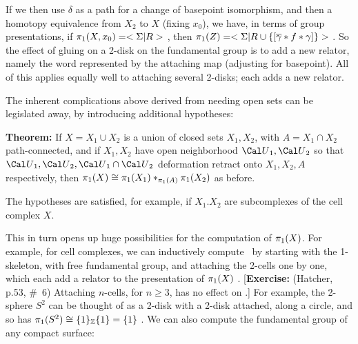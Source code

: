 
If we then use $\delta$ as a path for a change of 
basepoint isomorphism, and then a homotopy
equivalence from $X_2$ to $X$ (fixing $x_0$), we 
have, in terms of group presentations, 
if $\pi_1(X,x_0)=<\Sigma | R>$ , then $\pi_1(Z) = 
<\Sigma | R\cup\{[\overline{\gamma}*f*\gamma]\}>$ . 
So the effect of gluing on a 2-disk on the fundamental 
group is to add a new relator, 
namely the word represented by the attaching map 
(adjusting for basepoint). 
All of this applies equally well to attaching several 
2-disks; each adds a new relator. 

\msk


\leavevmode

\epsfxsize=5.4in



\bsk

The inherent complications above derived from needing open
sets can be legislated away, by introducing additional
hypotheses:

\msk

{\bf Theorem:} If $X=X_1\cup X_2$ is a union of closed
sets $X_1,X_2$, with $A=X_1\cap X_2$ path-connected, 
and if $X_1,X_2$ have open neighborhood ${\Cal U}_1,{\Cal U}_2$
so that ${\Cal U}_1,{\Cal U}_2,{\Cal U}_1\cap{\Cal U}_2$
deformation retract onto $X_1,X_2,A$ respectively, then 
$\pi_1(X)\cong \pi_1(X_1)*_{\pi_1(A)}\pi_1(X_2)$ as before.

\msk

The hypotheses are satisfied, for example, if $X_1.X_2$ are subcomplexes of the
cell complex $X$.

\msk


This in turn opens up huge possibilities for the 
computation of $\pi_1(X)$. For example, for cell complexes,
we can inductively compute \mpu\ by starting with 
the 1-skeleton, with free fundamental group, and 
attaching the 2-cells one by one, which each add 
a relator to the presentation of $\pi_1(X)$ . 
[{\bf Exercise:}
(Hatcher, p.53, \#\ 6) Attaching $n$-cells, for 
$n\geq 3$, has no effect on \mpu .] 
For example, the 2-sphere $S^2$ can be thought of as a
2-disk with a 2-disk attached, along a circle, and so has
$\pi_1(S^2)\cong \{1\}_{\Bbb Z}\{1\}=\{1\}$ . 
We can also compute the fundamental group of 
any compact surface:

\msk

